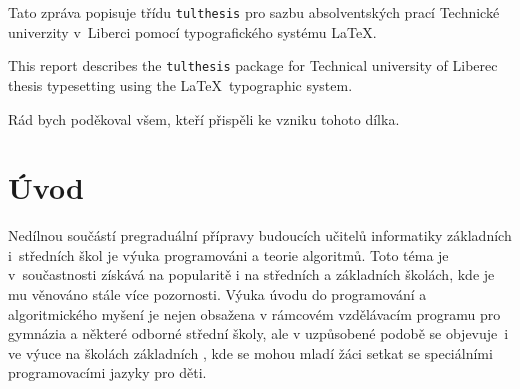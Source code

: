 \documentclass[FP,DP]{tulthesis}
\begin{document}

\begin{abstractCZ}
Tato zpráva popisuje třídu \texttt{tulthesis} pro sazbu absolventských prací
Technické univerzity v~Liberci pomocí typografického systému \LaTeX.
\end{abstractCZ}

\vspace{2cm}

\begin{abstractEN}
This report describes the \texttt{tulthesis} package for Technical university of
Liberec thesis typesetting using the \LaTeX\ typographic system.
\end{abstractEN}

\clearpage

\begin{acknowledgement}
Rád bych poděkoval všem, kteří přispěli ke vzniku tohoto dílka.
\end{acknowledgement}

\tableofcontents

\clearpage

\chapter{Úvod}
Nedílnou součástí pregraduální přípravy budoucích učitelů informatiky základních i~středních škol je výuka programováni a teorie algoritmů. Toto téma je v~součastnosti získává na popularitě i na středních a základních školách, kde je mu věnováno stále více pozornosti. Výuka úvodu do programování a algoritmického myšení je nejen obsažena v rámcovém vzdělávacím programu pro gymnázia a některé odborné střední školy, ale v uzpůsobené podobě se objevuje~i ve výuce na školách základních \parencite{t03}, kde se mohou mladí žáci setkat se speciálními programovacími jazyky pro děti.
\end{document}
